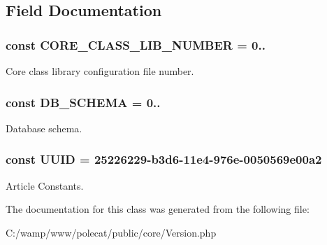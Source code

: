 \subsection{Field Documentation}
\hypertarget{class_able_polecat___version_a95f92188f9e046f03cc99f9ee504baa8}{}
\subsubsection[{C\+O\+R\+E\+\_\+\+C\+L\+A\+S\+S\+\_\+\+L\+I\+B\+\_\+\+N\+U\+M\+B\+E\+R}]{\setlength{\rightskip}{0pt plus 5cm}const C\+O\+R\+E\+\_\+\+C\+L\+A\+S\+S\+\_\+\+L\+I\+B\+\_\+\+N\+U\+M\+B\+E\+R = \textquotesingle{}0..\textquotesingle{}}\label{class_able_polecat___version_a95f92188f9e046f03cc99f9ee504baa8}
Core class library configuration file number. \hypertarget{class_able_polecat___version_a3dabb8ef8d3bd6fa02733c41a6235316}{}
\subsubsection[{D\+B\+\_\+\+S\+C\+H\+E\+M\+A}]{\setlength{\rightskip}{0pt plus 5cm}const D\+B\+\_\+\+S\+C\+H\+E\+M\+A = \textquotesingle{}0..\textquotesingle{}}\label{class_able_polecat___version_a3dabb8ef8d3bd6fa02733c41a6235316}
Database schema. \hypertarget{class_able_polecat___version_a74b892c8c0b86bf9d04c5819898c51e7}{}
\subsubsection[{U\+U\+I\+D}]{\setlength{\rightskip}{0pt plus 5cm}const U\+U\+I\+D = \textquotesingle{}25226229-\/b3d6-\/11e4-\/976e-\/0050569e00a2\textquotesingle{}}\label{class_able_polecat___version_a74b892c8c0b86bf9d04c5819898c51e7}
Article Constants. 

The documentation for this class was generated from the following file\+:\begin{DoxyCompactItemize}
\item 
C\+:/wamp/www/polecat/public/core/Version.\+php\end{DoxyCompactItemize}

